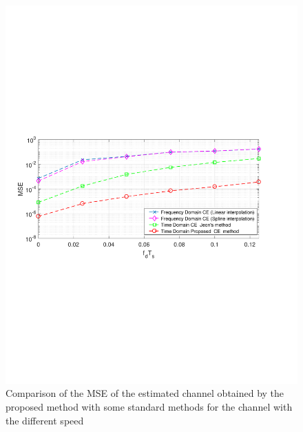 \documentclass[AMA]{WileyNJD-v1}
\begin{document}
{{{\begin{figure}
	\centering
	\includegraphics[width=1.0\linewidth]{figures/mse_speed.pdf}
	\caption{Comparison of the MSE of the estimated channel obtained by the proposed	method with some standard methods for the channel with the different speed}
	\label{fig:msespeed}
\end{figure}
				
}}}
\end{document}
